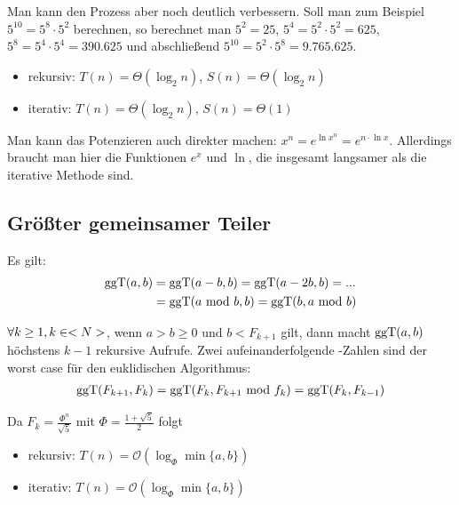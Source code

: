 Man kann den Prozess aber noch deutlich verbessern. Soll man zum Beispiel $5^{10}=5^8\cdot 5^2$ berechnen, so berechnet man $5^2=25$, $5^4=5^2\cdot 5^2=625$, $5^8=5^4\cdot 5^4=390.625$ und abschließend $5^{10}=5^2\cdot 5^8=9.765.625$.
\begin{itemize}
	\item rekursiv: $T(n)=\Theta(\log_2 n)$, $S(n)=\Theta(\log_2 n)$
	\item iterativ: $T(n)=\Theta(\log_2 n)$, $S(n)=\Theta(1)$
\end{itemize}

Man kann das Potenzieren auch direkter machen: $x^n=e^{\ln x^n}=e^{n\cdot\ln x}$. Allerdings braucht man hier die Funktionen $e^x$ und $\ln$, die insgesamt langsamer als die iterative Methode sind.

\subsection{Größter gemeinsamer Teiler}
Es gilt:
\begin{align}
	\operatorname{ggT}(a,b) &= \operatorname{ggT}(a-b,b) = \operatorname{ggT}(a-2b,b) = ... \notag \\
	&= \operatorname{ggT}(a\text{ mod } b,b) = \operatorname{ggT}(b, a\text{ mod } b) \notag
\end{align}

\begin{proposition}
	$\forall k\ge 1,k\in<N>$, wenn $a>b\ge 0$ und $b<F_{k+1}$ gilt, dann macht $\operatorname{ggT}(a,b)$ höchstens $k-1$ rekursive Aufrufe. Zwei aufeinanderfolgende -Zahlen sind der worst case für den euklidischen Algorithmus:
	\begin{align}
		\operatorname{ggT}(F_{k+1},F_k) = \operatorname{ggT}(F_k,F_{k+1}\text{ mod } f_k) = \operatorname{ggT}(F_k,F_{k-1})\notag
	\end{align}
\end{proposition}
Da $F_k=\frac{\Phi^n}{\sqrt{5}}$ mit $\Phi=\frac{1+\sqrt{5}}{2}$ folgt
\begin{itemize}
	\item rekursiv: $T(n)=\mathcal{O}(\log_\Phi\min\{a,b\})$
	\item iterativ: $T(n)=\mathcal{O}(\log_\Phi\min\{a,b\})$
\end{itemize}